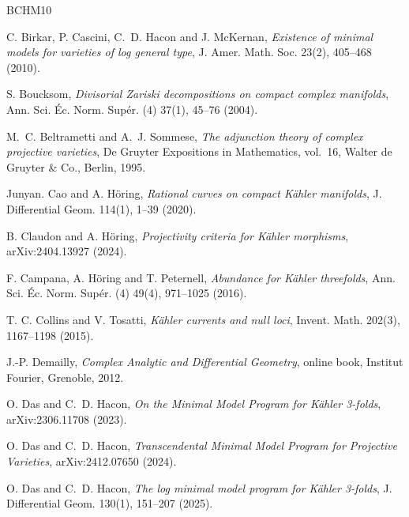 \documentclass[11pt]{amsart}
\numberwithin{equation}{section}
\theoremstyle{definition}
\theoremstyle{definition}
\theoremstyle{definition}
\begin{document}
\begin{thebibliography}{BCHM10}

 C. Birkar, P. Cascini, C.~D. Hacon and J. McKernan, {\it Existence of minimal models for varieties of log general type}, J. Amer. Math. Soc. 23(2), 405--468 (2010).




 S. Boucksom, {\it Divisorial Zariski decompositions on compact complex manifolds}, Ann. Sci. \'Ec. Norm. Sup\'er. (4) 37(1), 45--76 (2004).

 M.~C. Beltrametti and A.~J. Sommese, {\it The adjunction theory of complex projective varieties}, De Gruyter Expositions in Mathematics, vol.~16, Walter de Gruyter \& Co., Berlin, 1995.

 Junyan. Cao and A. H\"oring, {\it Rational curves on compact K\"ahler manifolds}, J. Differential Geom. 114(1), 1--39 (2020).

 B. Claudon and A. H\"oring, {\it Projectivity criteria for K\"ahler morphisms}, arXiv:2404.13927 (2024).

 F. Campana, A. H\"oring and T. Peternell, {\it Abundance for K\"ahler threefolds}, Ann. Sci. \'Ec. Norm. Sup\'er. (4) 49(4), 971--1025 (2016).

 T. C. Collins and V. Tosatti, {\it K\"ahler currents and null loci}, Invent. Math. 202(3), 1167--1198 (2015).

 J.-P. Demailly, {\it Complex Analytic and Differential Geometry}, online book, Institut Fourier, Grenoble, 2012.

 O. Das and C.~D. Hacon, {\it On the Minimal Model Program for K\"ahler 3-folds}, arXiv:2306.11708 (2023).

 O. Das and C.~D. Hacon, {\it Transcendental Minimal Model Program for Projective Varieties}, arXiv:2412.07650 (2024).

 O. Das and C.~D. Hacon, {\it The log minimal model program for K\"ahler 3-folds}, J. Differential Geom. 130(1), 151--207 (2025).


\end{thebibliography}
\end{document}
